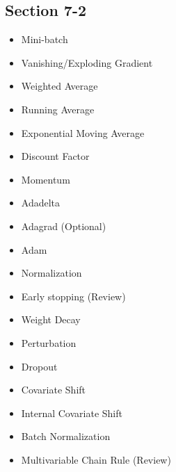     \subsection*{Section 7-2}

    \begin{itemize}
        \item Mini-batch
        \item Vanishing/Exploding Gradient
        \item Weighted Average
        \item Running Average
        \item Exponential Moving Average
        \item Discount Factor
        \item Momentum
        \item Adadelta
        \item Adagrad (Optional)
        \item Adam
        \item Normalization
        \item Early stopping (Review)
        \item Weight Decay
        \item Perturbation
        \item Dropout
        \item Covariate Shift
        \item Internal Covariate Shift
        \item Batch Normalization
        \item Multivariable Chain Rule (Review)
    \end{itemize}
            

            
        
        
        
        
        



